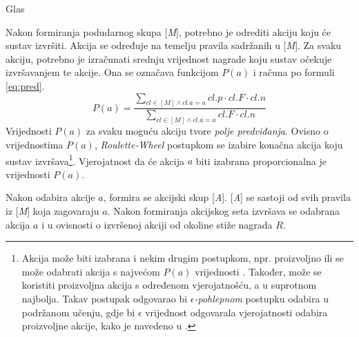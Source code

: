 \documentclass[times, utf8, zavrsni]{fer}
\begin{document}
\begin{algorithm}
    \caption{Glas}
    \label{vote}
    \begin{algorithmic}
        \ENDIF
    \end{algorithmic}
\end{algorithm}

Nakon formiranja podudarnog skupa [\emph{M}], potrebno je odrediti akciju koju će sustav izvršiti.
Akcija se određuje na temelju pravila sadržanih u [\emph{M}].
Za svaku akciju, potrebno je izračunati srednju vrijednost nagrade koju sustav očekuje izvršavanjem te akcije.
Ona se označava funkcijom $P(a)$ i računa po formuli \eqref{eq:pred}.
\begin{equation}
    \label{eq:pred}
    P(a) = \frac{\sum_{cl \in [M] \land cl.a = a} cl.p \cdot cl.F \cdot cl.n}{\sum_{cl \in [M] \land cl.a = a} cl.F \cdot cl.n}
\end{equation}
Vrijednosti $P(a)$ za svaku moguću akciju tvore \emph{polje predviđanja}.
Ovisno o vrijednostima $P(a)$, \emph{Roulette-Wheel} postupkom se izabire konačna akcija koju sustav izvršava\footnote{Akcija može biti izabrana i nekim drugim postupkom, npr. proizvoljno  ili se može odabrati akcija s najvećom $P(a)$ vrijednosti .
Također, može se koristiti proizvoljna akcija s određenom vjerojatnošću, a u suprotnom najbolja.
Takav postupak odgovarao bi \emph{$\epsilon$-pohlepnom}  postupku odabira u podržanom učenju, gdje bi $\epsilon$ vrijednost odgovarala vjerojatnosti odabira proizvoljne akcije, kako je navedeno u \citep{1}.}.
Vjerojatnost da će akcija $a$ biti izabrana proporcionalna je vrijednosti $P(a)$.

Nakon odabira akcije $a$, formira se akcijski skup [\emph{A}].
[\emph{A}] se sastoji od svih pravila iz [\emph{M}] koja zagovaraju $a$.
Nakon formiranja akcijskog seta izvršava se odabrana akcija $a$ i u ovisnosti o izvršenoj akciji od okoline stiže nagrada $R$.
\end{document}
